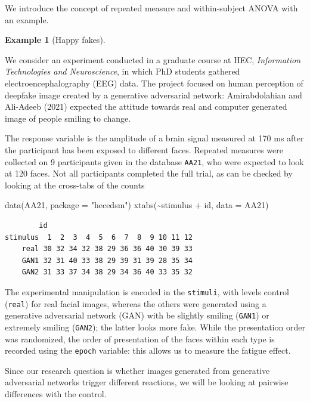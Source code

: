 \documentclass[
  11pt,
  letterpaper,
]{scrbook}
\newenvironment{Shaded}{\begin{snugshade}}{\end{snugshade}}
\newcommand{\AttributeTok}[1]{\textcolor[rgb]{0.40,0.45,0.13}{#1}}
\newcommand{\FunctionTok}[1]{\textcolor[rgb]{0.28,0.35,0.67}{#1}}
\newcommand{\NormalTok}[1]{\textcolor[rgb]{0.00,0.23,0.31}{#1}}
\newcommand{\SpecialCharTok}[1]{\textcolor[rgb]{0.37,0.37,0.37}{#1}}
\newcommand{\StringTok}[1]{\textcolor[rgb]{0.13,0.47,0.30}{#1}}
\theoremstyle{definition}
\theoremstyle{definition}
\newtheorem{example}{Example}[chapter]
\theoremstyle{remark}
\begin{document}
We introduce the concept of repeated measure and within-subject ANOVA
with an example.

\begin{example}[Happy
fakes]\protect\hypertarget{exm-happyfakes}{}\label{exm-happyfakes}

We consider an experiment conducted in a graduate course at HEC,
\emph{Information Technologies and Neuroscience}, in which PhD students
gathered electroencephalography (EEG) data. The project focused on human
perception of deepfake image created by a generative adversarial
network: Amirabdolahian and Ali-Adeeb (2021) expected the attitude
towards real and computer generated image of people smiling to change.

The response variable is the amplitude of a brain signal measured at 170
ms after the participant has been exposed to different faces. Repeated
measures were collected on 9 participants given in the database
\texttt{AA21}, who were expected to look at 120 faces. Not all
participants completed the full trial, as can be checked by looking at
the cross-tabs of the counts

\begin{Shaded}
\begin{Highlighting}[]
\FunctionTok{data}\NormalTok{(AA21, }\AttributeTok{package =} \StringTok{"hecedsm"}\NormalTok{)}
\FunctionTok{xtabs}\NormalTok{(}\SpecialCharTok{\textasciitilde{}}\NormalTok{stimulus }\SpecialCharTok{+}\NormalTok{ id, }\AttributeTok{data =}\NormalTok{ AA21)}
\end{Highlighting}
\end{Shaded}

\begin{verbatim}
        id
stimulus  1  2  3  4  5  6  7  8  9 10 11 12
    real 30 32 34 32 38 29 36 36 40 30 39 33
    GAN1 32 31 40 33 38 29 39 31 39 28 35 34
    GAN2 31 33 37 34 38 29 34 36 40 33 35 32
\end{verbatim}

The experimental manipulation is encoded in the \texttt{stimuli}, with
levels control (\texttt{real}) for real facial images, whereas the
others were generated using a generative adversarial network (GAN) with
be slightly smiling (\texttt{GAN1}) or extremely smiling
(\texttt{GAN2}); the latter looks more fake. While the presentation
order was randomized, the order of presentation of the faces within each
type is recorded using the \texttt{epoch} variable: this allows us to
measure the fatigue effect.

Since our research question is whether images generated from generative
adversarial networks trigger different reactions, we will be looking at
pairwise differences with the control.


\end{example}
\end{document}
